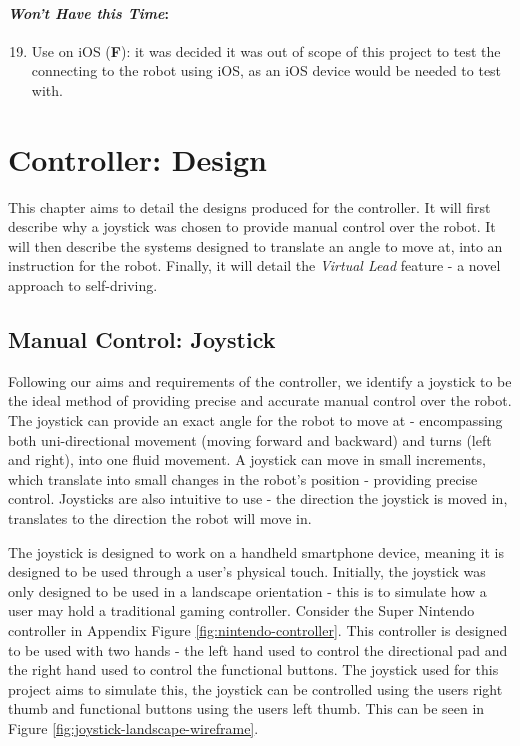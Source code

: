 \documentclass{l4proj}
\begin{document}
\subsubsection{\textit{Won't Have this Time}:}
\begin{enumerate}[label=B.\arabic*]
\setcounter{enumi}{18}
    \item Use on iOS (\textbf{F}): it was decided it was out of scope of this project to test the connecting to the robot using iOS, as an iOS device would be needed to test with.
\end{enumerate}


\chapter{Controller: Design}
This chapter aims to detail the designs produced for the controller. It will first describe why a joystick was chosen to provide manual control over the robot. It will then describe the systems designed to translate an angle to move at, into an instruction for the robot. Finally, it will detail the \textit{Virtual Lead} feature - a novel approach to self-driving.

\section{Manual Control: Joystick}\label{sec:joystick-design}
Following our aims and requirements of the controller, we identify a joystick to be the ideal method of providing precise and accurate manual control over the robot. The joystick can provide an exact angle for the robot to move at - encompassing both uni-directional movement (moving forward and backward) and turns (left and right), into one fluid movement. A joystick can move in small increments, which translate into small changes in the robot’s position - providing precise control. Joysticks are also intuitive to use - the direction the joystick is moved in, translates to the direction the robot will move in.

The joystick is designed to work on a handheld smartphone device, meaning it is designed to be used through a user's physical touch. Initially, the joystick was only designed to be used in a landscape orientation - this is to simulate how a user may hold a traditional gaming controller. Consider the Super Nintendo controller in Appendix Figure \ref{fig:nintendo-controller}. This controller is designed to be used with two hands - the left hand used to control the directional pad and the right hand used to control the functional buttons. The joystick used for this project aims to simulate this, the joystick can be controlled using the users right thumb and functional buttons using the users left thumb. This can be seen in Figure \ref{fig:joystick-landscape-wireframe}.
\end{document}

